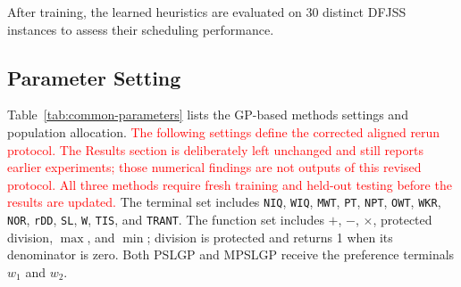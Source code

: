 \documentclass[10pt,journal]{IEEEtran}
\newcommand{\key}[1]{\textcolor{red}{#1}}
\begin{document}
After training, the learned heuristics are evaluated on 30 distinct DFJSS instances to assess their scheduling performance.

\subsection{Parameter Setting}
Table~\ref{tab:common-parameters} lists the GP-based methods settings and population allocation. 
\key{The following settings define the corrected aligned rerun protocol. The Results section is deliberately left unchanged and still reports earlier experiments; those numerical findings are not outputs of this revised protocol. All three methods require fresh training and held-out testing before the results are updated.}
The terminal set includes \texttt{NIQ}, \texttt{WIQ}, \texttt{MWT}, \texttt{PT}, \texttt{NPT}, \texttt{OWT}, \texttt{WKR}, \texttt{NOR}, \texttt{rDD}, \texttt{SL}, \texttt{W}, \texttt{TIS}, and \texttt{TRANT}. The function set includes $+$, $-$, $\times$, protected division, $\max$, and $\min$; division is protected and returns 1 when its denominator is zero. Both PSLGP and MPSLGP receive the preference terminals \texttt{$w_1$} and \texttt{$w_2$}.
\end{document}
